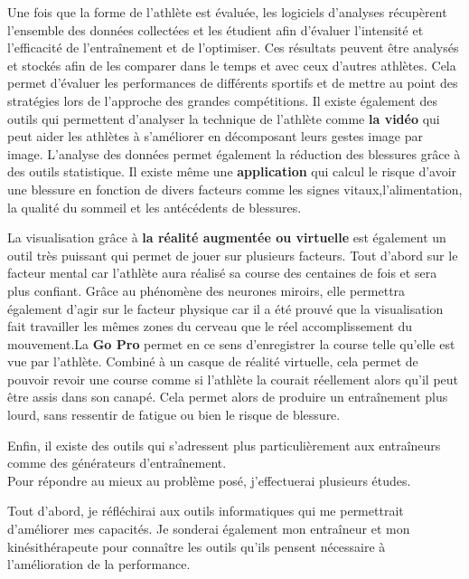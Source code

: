 Une fois que la forme de l'athlète est évaluée, les logiciels d'analyses récupèrent l’ensemble des données collectées et les étudient afin d’évaluer l’intensité et l’efficacité de l’entraînement et de l'optimiser. Ces résultats peuvent être analysés et stockés afin de les comparer dans le temps et avec ceux d’autres athlètes. Cela permet d’évaluer les performances de différents sportifs et de mettre au point des stratégies lors de l’approche des grandes compétitions. Il existe également des outils qui permettent d'analyser la technique de l'athlète comme \textbf{la vidéo} qui peut aider les athlètes à s’améliorer en décomposant leurs gestes image par image. L'analyse des données permet également la réduction des blessures grâce à des outils statistique. Il existe même une \textbf{application} qui calcul le risque d'avoir une blessure en fonction de divers facteurs comme les signes vitaux,l'alimentation, la qualité du sommeil et les antécédents de blessures.

La visualisation grâce à \textbf{la réalité augmentée ou virtuelle} est également un outil très puissant qui permet de jouer sur plusieurs facteurs. Tout d'abord sur le facteur mental car l'athlète aura réalisé sa course des centaines de fois et sera plus confiant. Grâce au phénomène des neurones miroirs, elle permettra également d'agir sur le facteur physique car il a été prouvé que la visualisation fait travailler les mêmes zones du cerveau que le réel accomplissement du mouvement.La \textbf{Go Pro} permet en ce sens d'enregistrer la course telle qu'elle est vue par l'athlète. Combiné à un casque de réalité virtuelle, cela permet de pouvoir revoir une course comme si l'athlète la courait réellement alors qu'il peut être assis dans son canapé. Cela permet alors de produire un entraînement plus lourd, sans ressentir de fatigue ou bien le risque de blessure.


Enfin, il existe des outils qui s'adressent plus particulièrement aux entraîneurs comme des générateurs d'entraînement. \\

Pour répondre au mieux au problème posé, j'effectuerai plusieurs études.

Tout d'abord, je réfléchirai aux outils informatiques qui me permettrait d'améliorer mes capacités. Je sonderai également mon entraîneur et mon kinésithérapeute pour connaître les outils qu'ils pensent nécessaire à l'amélioration de la performance.

